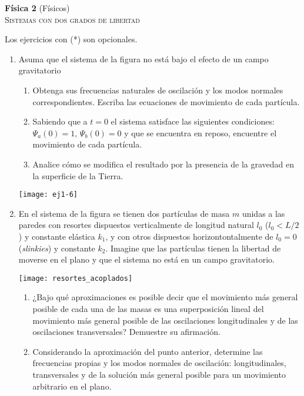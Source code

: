 \documentclass[11pt,spanish,a4paper]{article}
\begin{document}
\begin{center}
\textbf{Física 2} (Físicos) \hfill {}\\
	\textsc{\LARGE Sistemas con dos grados de libertad}
\end{center}

Los ejercicios con (*) son opcionales.


\begin{enumerate}


\item
\begin{minipage}[t][4.5cm]{0.75\textwidth}
Asuma que el sistema de la figura no está bajo el efecto de un campo gravitatorio
\begin{enumerate}
	\item Obtenga sus frecuencias naturales de oscilación y los modos normales correspondientes.
	Escriba las ecuaciones de movimiento de cada partícula.
	\item Sabiendo que a $t= 0$ el sistema satisface las siguientes condiciones: $\Psi_a(0)= 1, \, \Psi_b(0)= 0$ y que se encuentra en reposo, encuentre el movimiento de cada partícula.
	\item Analice cómo se modifica el resultado por la presencia de la gravedad en la superficie de la Tierra.
\end{enumerate}
\end{minipage}
\begin{minipage}[c][0cm][t]{0.2\textwidth}
  \texttt{[image: ej1-6]}
\end{minipage}



\item
\begin{minipage}[t][3cm]{0.6\textwidth}
En el sistema de la figura se tienen dos partículas de masa $m$ unidas a las paredes con resortes dispuestos verticalmente de longitud natural $l_0$ ($l_0< L/2$) y constante elástica $k_1$, y con otros dispuestos horizontontalmente de $l_0= 0$ (\emph{slinkies}) y constante $k_2$.
Imagine que las partículas tienen la libertad de moverse en el plano y que el sistema no está en un campo gravitatorio.
\end{minipage}
\begin{minipage}[c][1cm][t]{0.35\textwidth}
  \texttt{[image: resortes\_acoplados]}
\end{minipage}
\begin{enumerate}
	\item ¿Bajo qué aproximaciones es posible decir que el movimiento más general posible de cada una de las masas es una superposición lineal del movimiento más general posible de las oscilaciones longitudinales y de las oscilaciones transversales?
	Demuestre su afirmación.
	\item Considerando la aproximación del punto anterior, determine las frecuencias propias y los modos normales de oscilación: longitudinales, transversales y de la solución más general posible para un movimiento arbitrario en el plano.
\end{enumerate}




\end{enumerate}
\end{document}

